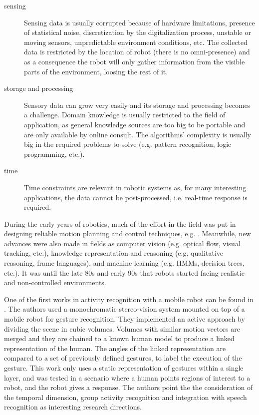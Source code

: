\begin{description}
\item[sensing] Sensing data is usually corrupted because of hardware limitations, presence of statistical noise, discretization by the digitalization process, unstable or moving sensors, unpredictable environment conditions, etc.
The collected data is restricted by the location of robot (there is no omni-presence) and as a consequence the robot will only gather information from the visible parts of the environment, loosing the rest of it.
\item[storage and processing] %
Sensory data can grow very easily and its storage and processing becomes a challenge.
Domain knowledge is usually restricted to the field of application, as general knowledge sources are too big to be portable and are only available by online consult.
The algorithms' complexity is usually big in the required problems to solve (e.g. pattern recognition, logic programming, etc.). 
\item[time] Time constraints are relevant in robotic systems as, for many interesting applications, the data cannot be post-processed, i.e. real-time response is required.
\end{description}

During the early years of robotics, much of the effort in the field was put in designing reliable motion planning and control techniques, e.g. \citep{Moravec1983_StanfordCMUCarts,brook-1985:robuslayer:TR}. 
Meanwhile, new advances were also made in fields as computer vision (e.g. optical flow, visual tracking, etc.), knowledge representation and reasoning (e.g. qualitative reasoning, frame languages), and machine learning (e.g. HMMs, decision trees, etc.).
It was until the late 80s and early 90s that robots started facing realistic and non-controlled environments.

One of the first works in activity recognition with a mobile robot can be found in \citep{Kortenkamp1996_RIG,Bonasso96recognizingand}. 
The authors used a monochromatic stereo-vision system mounted on top of a mobile robot for gesture recognition.
They implemented an active approach by dividing the scene in cubic volumes.
Volumes with similar motion vectors are merged and they are chained to a known human model to produce a linked representation of the human.
The angles of the linked representation are compared to a set of previously defined gestures, to label the execution of the gesture.
This work only uses a static representation of gestures within a single layer, and was tested in a scenario where a human points regions of interest to a robot, and the robot gives a response.
The authors point the the consideration of the temporal dimension, group activity recognition and integration with speech recognition as interesting research directions.

